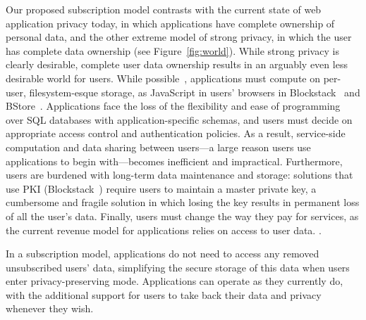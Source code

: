 Our proposed subscription model contrasts with the current state of web application privacy today,
in which applications have complete ownership of personal data, and the other extreme model of
strong privacy, in which the user has complete data ownership (see Figure~\ref{fig:world}).  While
strong privacy is clearly desirable, complete user data ownership results in an arguably even less
desirable world for users. While possible~\cite{amber, w5, blockstack, bstore}, applications
must compute on per-user, filesystem-esque storage, \eg as JavaScript in users' browsers in
Blockstack~\cite{blockstack} and BStore~\cite{bstore}. Applications face the loss of the flexibility
and ease of programming over SQL databases with application-specific schemas, and users must decide
on appropriate access control and authentication policies. As a result, service-side computation and
data sharing between users---a large reason users use applications to begin with---becomes
inefficient and impractical. 
%
Furthermore, users are burdened with long-term data maintenance and storage: solutions that use PKI
(\eg Blockstack~\cite{blockstack}) require users to maintain a
master private key, a cumbersome and fragile solution in which losing the key results in permanent
loss of all the user's data.
%
Finally, users must change the way they pay for services, as the current revenue model for
applications relies on access to user data. 
.

In a subscription model, applications do not need to access any removed unsubscribed users' data,
simplifying the secure storage of this data when users enter privacy-preserving mode. Applications
can operate as they currently do, with the additional support for users to take back their data and
privacy whenever they wish.
